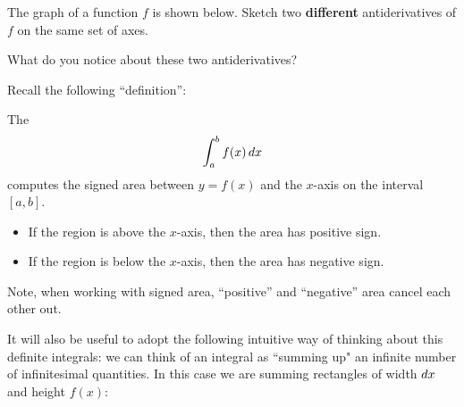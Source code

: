 \documentclass[handout]{ximera}
\begin{document}
\begin{exercise}
	
	The graph of a function $f$ is shown below.  Sketch two \textbf{different} antiderivatives of $f$ on the same set of axes.
	
\begin{image}
\end{image}

What do you notice about these two antiderivatives?

\end{exercise}

Recall the following ``definition'':

\begin{definition}
	The 
	\[
	\int_a^b f(x) \mathop{}\!d x
	\]
	computes the signed area between $y=f(x)$ and the $x$-axis on the
	interval $[a,b]$.
	\begin{itemize}
		\item If the region is above the $x$-axis, then the area has
		positive sign.
		\item If the region is below the $x$-axis, then the area has
		negative sign.
	\end{itemize}
	Note, when working with signed area, ``positive'' and ``negative''
	area cancel each other out.
\end{definition}


It will also be useful to adopt the following intuitive way of
thinking about this definite integrals: we can
think of an integral as ``summing up" an infinite number of
infinitesimal quantities. In this case we are summing rectangles of
width $\mathop{}\!d x$ and height $f(x)$:
\end{document}
